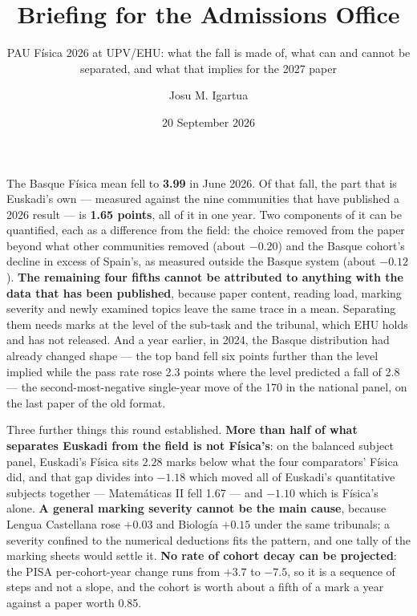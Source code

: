 \documentclass[
  10.5pt,
  a4paper,
  DIV=11,
  numbers=noendperiod]{scrartcl}
\title{Briefing for the Admissions Office}
\subtitle{PAU Física 2026 at UPV/EHU: what the fall is made of, what can
and cannot be separated, and what that implies for the 2027 paper}
\author{Josu M. Igartua}
\date{20 September 2026}
\renewcommand*\contentsname{Table of contents}
\newcommand\contentsname{Table of contents}
\begin{document}
\maketitle

\renewcommand*\contentsname{Table of contents}
{
\setcounter{tocdepth}{2}
\tableofcontents
}

\begin{tcolorbox}[enhanced jigsaw, arc=.35mm, bottomrule=.15mm, bottomtitle=1mm, breakable, colback=white, colbacktitle=quarto-callout-important-color!10!white, colframe=quarto-callout-important-color-frame, coltitle=black, left=2mm, leftrule=.75mm, opacityback=0, opacitybacktitle=0.6, rightrule=.15mm, title=\textcolor{quarto-callout-important-color}{\faExclamation}\hspace{0.5em}{The short version}, titlerule=0mm, toprule=.15mm, toptitle=1mm]

The Basque Física mean fell to \textbf{3.99} in June 2026. Of that fall,
the part that is Euskadi's own --- measured against the nine communities
that have published a 2026 result --- is \textbf{1.65 points}, all of it
in one year. Two components of it can be quantified, each as a
difference from the field: the choice removed from the paper beyond what
other communities removed (about \(-0.20\)) and the Basque cohort's
decline in excess of Spain's, as measured outside the Basque system
(about \(-0.12\)). \textbf{The remaining four fifths cannot be
attributed to anything with the data that has been published}, because
paper content, reading load, marking severity and newly examined topics
leave the same trace in a mean. Separating them needs marks at the level
of the sub-task and the tribunal, which EHU holds and has not released.
And a year earlier, in 2024, the Basque distribution had already changed
shape --- the top band fell six points further than the level implied
while the pass rate rose 2.3 points where the level predicted a fall of
2.8 --- the second-most-negative single-year move of the 170 in the
national panel, on the last paper of the old format.

Three further things this round established. \textbf{More than half of
what separates Euskadi from the field is not Física's}: on the balanced
subject panel, Euskadi's Física sits \(2.28\) marks below what the four
comparators' Física did, and that gap divides into \(-1.18\) which moved
all of Euskadi's quantitative subjects together --- Matemáticas II fell
1.67 --- and \(-1.10\) which is Física's alone. \textbf{A general
marking severity cannot be the main cause}, because Lengua Castellana
rose \(+0.03\) and Biología \(+0.15\) under the same tribunals; a
severity confined to the numerical deductions fits the pattern, and one
tally of the marking sheets would settle it. \textbf{No rate of cohort
decay can be projected}: the PISA per-cohort-year change runs from
\(+3.7\) to \(-7.5\), so it is a sequence of steps and not a slope, and
the cohort is worth about a fifth of a mark a year against a paper worth
0.85.


\end{tcolorbox}
\end{document}
